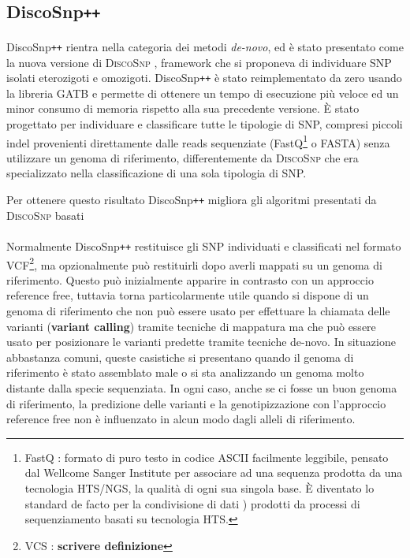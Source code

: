 \documentclass[../main.tex]{subfiles}
\begin{document}
\subsection{DiscoSnp\texttt{++}}
\label{discosnp++}
\paragraph{}
DiscoSnp\texttt{++} \cite{peterlongo2017discosnp++} rientra nella categoria dei metodi \textit{de-novo}, ed è stato presentato come la nuova versione di \textsc{DiscoSnp} \cite{uricaru2015reference}, framework che si proponeva di individuare SNP isolati eterozigoti e omozigoti. DiscoSnp\texttt{++} è stato reimplementato da zero usando la libreria GATB \cite{drezen2014gatb} e permette di ottenere un tempo di esecuzione più veloce ed un minor consumo di memoria rispetto alla sua precedente versione. È stato progettato per individuare e classificare tutte le tipologie di SNP, compresi piccoli indel provenienti direttamente dalle reads sequenziate (FastQ\footnote{FastQ :  formato di puro testo in codice ASCII facilmente leggibile, pensato dal Wellcome Sanger Institute per associare ad una sequenza prodotta da una tecnologia HTS/NGS, la qualità di ogni sua singola base. È diventato lo standard de facto per la condivisione di dati \cite{cock2010sanger}) prodotti da processi di sequenziamento basati su tecnologia HTS. } o FASTA) senza utilizzare un genoma di riferimento, differentemente da \textsc{DiscoSnp} che era specializzato nella classificazione di una sola tipologia di SNP.

Per ottenere questo risultato DiscoSnp\texttt{++} migliora gli algoritmi presentati da \textsc{DiscoSnp} basati
\paragraph{}  Normalmente DiscoSnp\texttt{++} restituisce gli SNP individuati e classificati nel formato VCF\footnote{VCS : \textbf{scrivere definizione}}, ma opzionalmente può restituirli dopo averli mappati su un genoma di riferimento. Questo può inizialmente apparire in contrasto con un approccio reference free, tuttavia torna particolarmente utile quando si dispone di un genoma di riferimento che non può essere usato per effettuare la chiamata delle varianti (\textbf{variant calling}) tramite tecniche di mappatura ma che può essere usato per posizionare le varianti predette tramite tecniche de-novo. In situazione abbastanza comuni, queste casistiche si presentano quando il genoma di riferimento è stato assemblato male o si sta analizzando un genoma molto distante dalla specie sequenziata. In ogni caso, anche se ci fosse un buon genoma di riferimento, la predizione delle varianti e la genotipizzazione con l'approccio reference free non è influenzato in alcun modo dagli alleli di riferimento.
\end{document}
